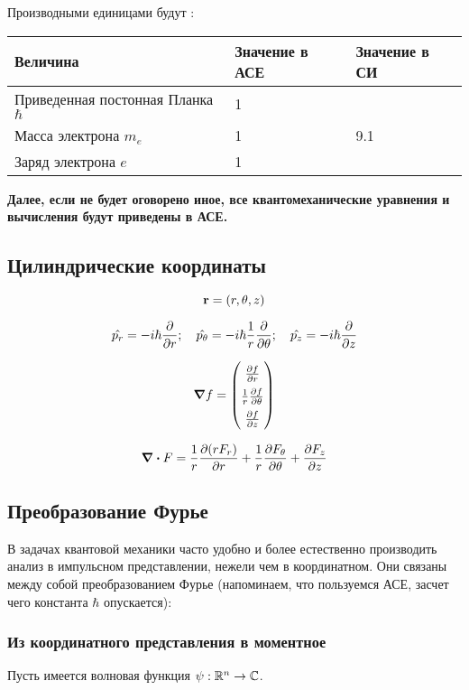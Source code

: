 Производными единицами будут :

\begin{table}[h]
\begin{tabular}{|l|l|l|}
\hline
Величина & Значение в АСЕ & Значение в СИ \\\hline
Приведенная постонная Планка $\hbar$ & 1 & \\\hline
Масса электрона $m_e$ & 1 &  9.1  \\\hline
Заряд электрона $e$   & 1 & \\\hline
\end{tabular}
\end{table}

\textbf{Далее, если не будет оговорено иное, все квантомеханические уравнения и вычисления будут приведены в АСЕ.}

\subsection{Цилиндрические координаты}

\[
\vb{r} = (r, \theta, z)
\]

\[
\hat {p_r} = - i \hbar \pdv{r};\quad 
\hat{p_\theta} = - i \hbar \frac{1}{r} \pdv{\theta};\quad 
\hat{p_z} = - i \hbar \pdv{z}
\]

$$\renewcommand\arraystretch{1.5}
\gradient f = 
\begin{pmatrix}
\pdv{f}{r} \\
\frac{1}{r} \pdv{f}{\theta}  \\
\pdv{f}{z} 
\end{pmatrix}
$$


$$
\divergence F =
\frac{1}{r} \pdv{(r F_r)}{r}
+ \frac{1}{r} \pdv{F_\theta}{\theta}
+ \pdv{F_z}{z}
$$


\subsection{Преобразование Фурье}
В задачах квантовой механики часто удобно и более естественно производить анализ в импульсном представлении, нежели чем в координатном. Они связаны между собой преобразованием Фурье (напоминаем, что пользуемся АСЕ, засчет чего константа $\hbar$ опускается):

\subsubsection{Из координатного представления в моментное}
Пусть имеется волновая функция $\psi: \mathbb{R}^n \to \mathbb{C}$. 


